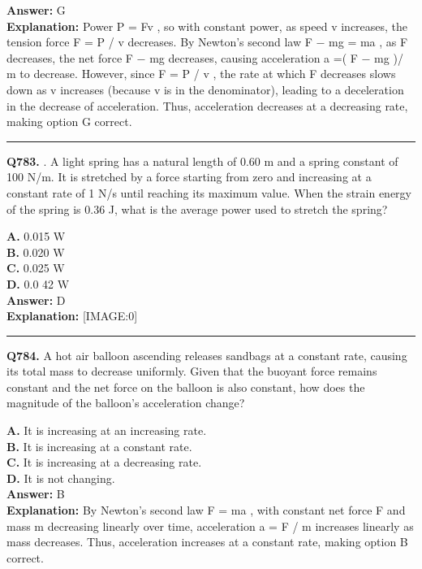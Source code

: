 \documentclass[12pt]{article}
\begin{document}
\textbf{Answer:} G \\
\textbf{Explanation:} Power
P
=
Fv
, so with constant power, as speed
v
increases, the tension force
F
=
P
/
v
decreases. By Newton’s second law
F
−
mg
=
ma
, as
F
decreases, the net force
F
−
mg
decreases, causing acceleration
a
=(
F
−
mg
)/
m
to decrease. However, since
F
=
P
/
v
, the rate at which
F
decreases slows down as
v
increases (because
v
is in the denominator), leading to a deceleration in the decrease of acceleration. Thus, acceleration decreases at a decreasing rate, making option G correct.

\hrule
\vspace{1em}


\noindent
\textbf{Q783.} .
A light spring has a natural length of 0.60 m and a spring constant of 100 N/m. It is stretched by a force starting from zero and increasing at a constant rate of
1
N/s until reaching its maximum value. When the strain energy of the spring is 0.36 J, what is the average power used to stretch the spring?



\textbf{A.} 0.015 W \\
\textbf{B.} 0.020 W \\
\textbf{C.} 0.025 W \\
\textbf{D.} 0.0
42
W \\

\textbf{Answer:} D \\
\textbf{Explanation:} [IMAGE:0]

\hrule
\vspace{1em}


\noindent
\textbf{Q784.} A hot air balloon ascending releases sandbags at a constant rate, causing its total mass to decrease uniformly. Given that the buoyant force remains constant and the net force on the balloon is also constant, how does the magnitude of the balloon’s acceleration change?



\textbf{A.} It is increasing at an increasing rate. \\
\textbf{B.} It is increasing at a constant rate. \\
\textbf{C.} It is increasing at a decreasing rate. \\
\textbf{D.} It is not changing. \\

\textbf{Answer:} B \\
\textbf{Explanation:} By Newton’s second law
F
=
ma
, with constant net force
F
and mass
m
decreasing linearly over time, acceleration
a
=
F
/
m
increases linearly as mass decreases. Thus, acceleration increases at a constant rate, making option B correct.
\end{document}
